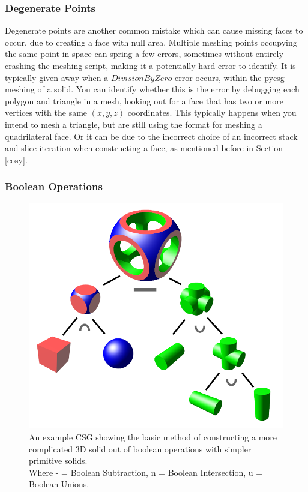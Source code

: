 \documentclass[12pt,a4paper]{article}
\begin{document}
\subsubsection{Degenerate Points}
Degenerate points are another common mistake which can cause missing faces to occur, due to creating a face with null area. Multiple meshing points occupying the same point in space can spring a few errors, sometimes without entirely crashing the meshing script, making it a potentially hard error to identify. It is typically given away when a $DivisionByZero$ error occurs, within the pycsg meshing of a solid. You can identify whether this is the error by debugging each polygon and triangle in a mesh, looking out for a face that has two or more vertices with the same $(x,y,z)$ coordinates. This typically happens when you intend to mesh a triangle, but are still using the format for meshing a quadrilateral face. Or it can be due to the incorrect choice of an incorrect stack and slice iteration when constructing a face, as mentioned before in Section \ref{cosy}.

\subsubsection{Boolean Operations}
\label{bool}
\begin{figure}[h!]
\centering
\includegraphics[scale=0.25]{Images//Booleans//Boolean.png}
\caption[width=\columnwidth]{An example CSG showing the basic method of constructing a more complicated 3D solid out of boolean operations with simpler primitive solids.\\
Where - = Boolean Subtraction, n = Boolean Intersection, u = Boolean Unions.}
\label{booly}
\end{figure}
\end{document}
